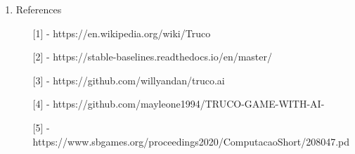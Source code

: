 \documentclass{article}
\begin{document}
\begin{enumerate}
\item References
\begin{enumerate}
    \item[] [1] - https://en.wikipedia.org/wiki/Truco
    \item[] [2] - https://stable-baselines.readthedocs.io/en/master/
    \item[] [3] - https://github.com/willyandan/truco.ai
    \item[] [4] - https://github.com/mayleone1994/TRUCO-GAME-WITH-AI-
    \item[] [5] - https://www.sbgames.org/proceedings2020/ComputacaoShort/208047.pd

\end{enumerate}

\end{enumerate}
\end{document}
